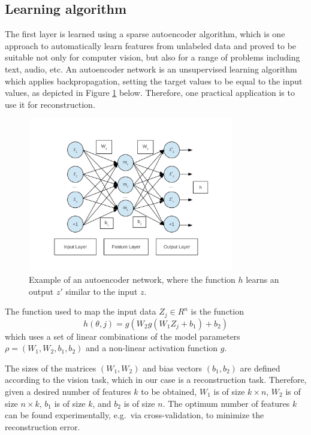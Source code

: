\documentclass[runningheads]{llncs}
\begin{document}
\subsection{Learning algorithm} 

The first layer is learned using a sparse autoencoder algorithm, which is one approach to automatically learn features from unlabeled data and proved to be suitable not only for computer vision, but also for a range of problems including text, audio, etc. An autoencoder network is an unsupervised learning algorithm which applies backpropagation, setting the target values to be equal to the input values, as depicted in Figure \ref{fig:autoencoder} below. Therefore, one practical application is to use it for reconstruction. 

\begin{figure}
\begin{center}
\includegraphics[width = 0.8\textwidth]{autoencoder}
\end{center}
\caption{Example of an autoencoder network, where the function $h$ learns an output $z'$ similar to the input $z$.}
\label{fig:autoencoder}
\end{figure}

The function used to map the input data $Z_j\in R^n$ is the function
\begin{equation}
 h(\theta,j)= g(W_2 g(W_1 Z_j+b_1)+b_2)
\end{equation}
which uses a set of linear combinations of the model parameters 
$\rho=(W_1,W_2,b_1,b_2)$ and a non-linear activation function $g$.

The sizes of the matrices $(W_1,W_2)$ and bias vectors $(b_1,b_2)$ are defined according to the vision task, which in our case is a reconstruction task. Therefore, given a desired number of features $k$ to be obtained, $W_1$ is of size $k\times n$, $W_2$ is of size $n\times k$, $b_1$ is of size $k$, and $b_2$ is of size $n$. The optimum number of features $k$ can be found experimentally, e.g.\ via cross-validation, to minimize the reconstruction error.
\end{document}
